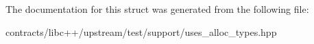 The documentation for this struct was generated from the following file\+:\begin{DoxyCompactItemize}
\item 
contracts/libc++/upstream/test/support/uses\+\_\+alloc\+\_\+types.\+hpp\end{DoxyCompactItemize}
